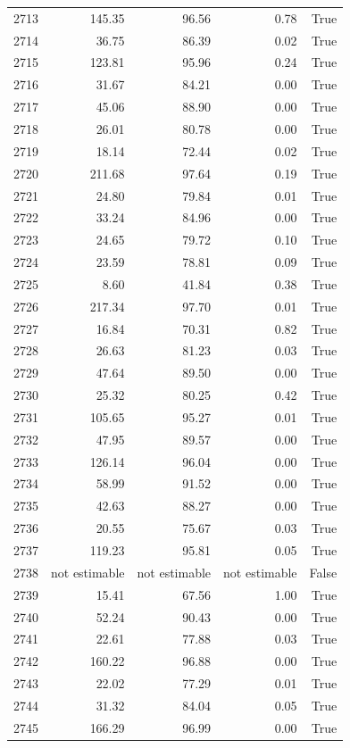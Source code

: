 \begin{longtable}{rrrrr}
2713 & 145.35 & 96.56 & 0.78 & True \\
2714 & 36.75 & 86.39 & 0.02 & True \\
2715 & 123.81 & 95.96 & 0.24 & True \\
2716 & 31.67 & 84.21 & 0.00 & True \\
2717 & 45.06 & 88.90 & 0.00 & True \\
2718 & 26.01 & 80.78 & 0.00 & True \\
2719 & 18.14 & 72.44 & 0.02 & True \\
2720 & 211.68 & 97.64 & 0.19 & True \\
2721 & 24.80 & 79.84 & 0.01 & True \\
2722 & 33.24 & 84.96 & 0.00 & True \\
2723 & 24.65 & 79.72 & 0.10 & True \\
2724 & 23.59 & 78.81 & 0.09 & True \\
2725 & 8.60 & 41.84 & 0.38 & True \\
2726 & 217.34 & 97.70 & 0.01 & True \\
2727 & 16.84 & 70.31 & 0.82 & True \\
2728 & 26.63 & 81.23 & 0.03 & True \\
2729 & 47.64 & 89.50 & 0.00 & True \\
2730 & 25.32 & 80.25 & 0.42 & True \\
2731 & 105.65 & 95.27 & 0.01 & True \\
2732 & 47.95 & 89.57 & 0.00 & True \\
2733 & 126.14 & 96.04 & 0.00 & True \\
2734 & 58.99 & 91.52 & 0.00 & True \\
2735 & 42.63 & 88.27 & 0.00 & True \\
2736 & 20.55 & 75.67 & 0.03 & True \\
2737 & 119.23 & 95.81 & 0.05 & True \\
2738 & not estimable & not estimable & not estimable & False \\
2739 & 15.41 & 67.56 & 1.00 & True \\
2740 & 52.24 & 90.43 & 0.00 & True \\
2741 & 22.61 & 77.88 & 0.03 & True \\
2742 & 160.22 & 96.88 & 0.00 & True \\
2743 & 22.02 & 77.29 & 0.01 & True \\
2744 & 31.32 & 84.04 & 0.05 & True \\
2745 & 166.29 & 96.99 & 0.00 & True \\

\end{longtable}
